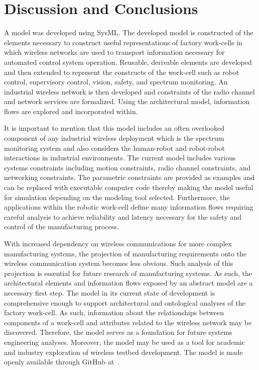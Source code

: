 \section{Discussion and Conclusions}\label{sysml:sec:conclusion}
A model was developed using SysML. The developed model is constructed of the elements necessary to construct useful representations of factory work-cells in which wireless networks are used to transport information necessary for automated control system operation.  Reusable, derivable elements are developed and then extended to represent the constructs of the work-cell such as robot control, supervisory control, vision, safety, and spectrum monitoring.  An industrial wireless network is then developed and constraints of the radio channel and network services are formalized. Using the architectural model, information flows are explored and incorporated within. 

It is important to mention that this model includes an often overlooked component of any industrial wireless deployment which is the spectrum monitoring system and also considers the human-robot and robot-robot interactions in industrial environments. The current model includes various systems constraints including motion constraints, radio channel constraints, and networking constraints. The parametric constraints are provided as examples and can be replaced with executable computer code thereby making the model useful for simulation depending on the modeling tool selected. Furthermore, the applications within the robotic work-cell define many information flows requiring careful analysis to achieve reliability and latency necessary for the safety and control of the manufacturing process.

With increased dependency on wireless communications for more complex manufacturing systems, the projection of manufacturing requirements onto the wireless communication system becomes less obvious. Such analysis of this projection is essential for future research of manufacturing systems. As such, the architectural elements and information flows exposed by an abstract model
are a necessary first step. The model in its current state of development is comprehensive enough to support architectural and ontological analyses of the factory work-cell.  As such, information about the relationships between components of a work-cell and attributes related to the wireless network may be discovered. Therefore, the model serves as a foundation for future systems engineering analyses. Moreover, the model may be used as a tool for academic and industry exploration of wireless testbed development.  The model is made openly available through GitHub at~\cite{SysML.Candell2018}.

%
%
